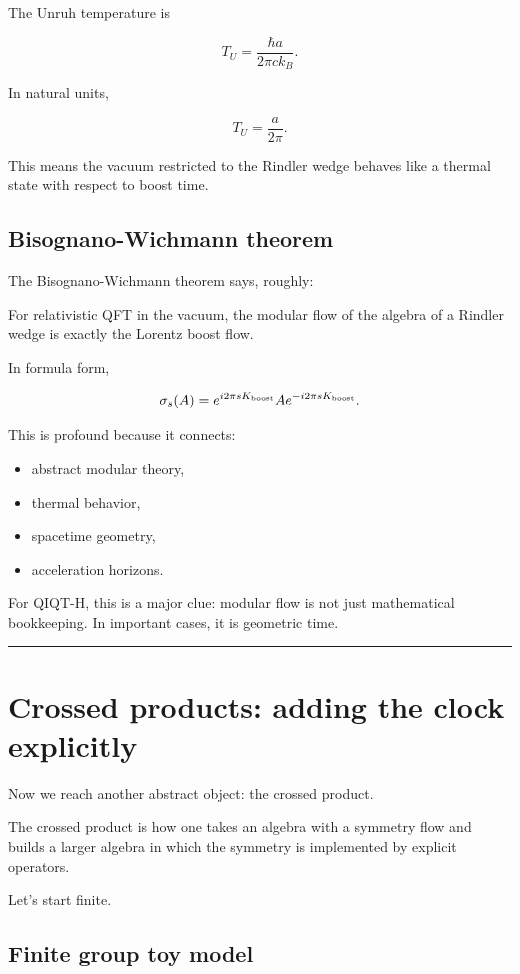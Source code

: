 \documentclass[11pt,a4paper]{article}
\newenvironment{qiqtquote}{\begin{mdframed}[style=quotestyle]}{\end{mdframed}}
\begin{document}
The Unruh temperature is

\[
T_U=\frac{\hbar a}{2\pi c k_B}.
\]

In natural units,

\[
T_U=\frac{a}{2\pi}.
\]

This means the vacuum restricted to the Rindler wedge behaves like a thermal state with respect to boost time.

\subsection{Bisognano-Wichmann theorem}

The Bisognano-Wichmann theorem says, roughly:

\begin{qiqtquote}
For relativistic QFT in the vacuum, the modular flow of the algebra of a Rindler wedge is exactly the Lorentz boost flow.
\end{qiqtquote}

In formula form,

\[
\sigma_s(A)=e^{i 2\pi s K_{\rm boost}} A e^{-i 2\pi s K_{\rm boost}}.
\]

This is profound because it connects:

\begin{itemize}
  \item abstract modular theory,
  \item thermal behavior,
  \item spacetime geometry,
  \item acceleration horizons.
\end{itemize}

For QIQT-H, this is a major clue: modular flow is not just mathematical bookkeeping. In important cases, it is geometric time.

\medskip\hrule\medskip

\section{Crossed products: adding the clock explicitly}

Now we reach another abstract object: the crossed product.

The crossed product is how one takes an algebra with a symmetry flow and builds a larger algebra in which the symmetry is implemented by explicit operators.

Let’s start finite.

\subsection{Finite group toy model}
\end{document}
